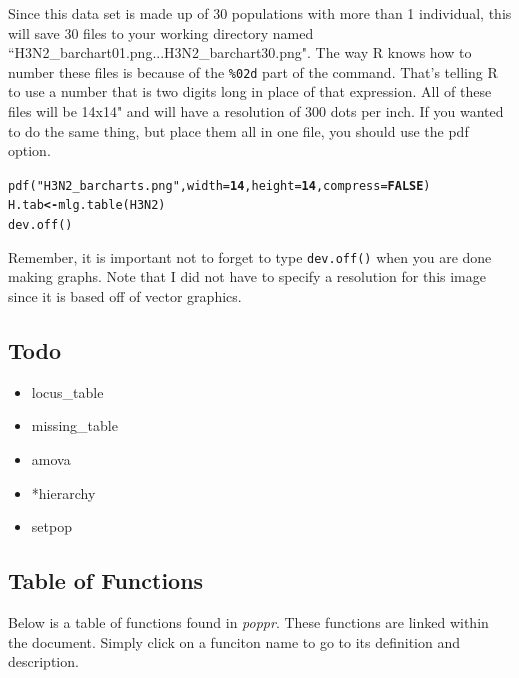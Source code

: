 \documentclass[letterpaper]{article}\usepackage[]{graphicx}\usepackage[]{color}
\makeatletter
\newcommand{\hlnum}[1]{\textcolor[rgb]{0.502,0,0.502}{\textbf{#1}}}%
\newcommand{\hlstr}[1]{\textcolor[rgb]{0.651,0.522,0}{#1}}%
\newcommand{\hlstd}[1]{\textcolor[rgb]{0,0,0}{#1}}%
\newcommand{\hlkwb}[1]{\textcolor[rgb]{0.502,0.502,0.753}{\textbf{#1}}}%
\newcommand{\hlkwc}[1]{\textcolor[rgb]{0,0.502,0.753}{#1}}%
\newcommand{\hlkwd}[1]{\textcolor[rgb]{0,0.267,0.4}{#1}}%
\newenvironment{kframe}{%
 \def\at@end@of@kframe{}%
 \ifinner\ifhmode%
  \def\at@end@of@kframe{\end{minipage}}%
  \begin{minipage}{\columnwidth}%
 \fi\fi%
 \def\FrameCommand##1{\hskip\@totalleftmargin \hskip-\fboxsep
 \colorbox{shadecolor}{##1}\hskip-\fboxsep
     \hskip-\linewidth \hskip-\@totalleftmargin \hskip\columnwidth}%
 \MakeFramed {\advance\hsize-\width
   \@totalleftmargin\z@ \linewidth\hsize
   \@setminipage}}%
 {\par\unskip\endMakeFramed%
 \at@end@of@kframe}
\newenvironment{knitrout}{}{} %
\newcommand{\tab}{\hspace*{1em}}
\makeatother
\begin{document}
Since this data set is made up of 30 populations with more than 1 individual, this will save 30 files to your working directory named ``H3N2\_barchart01.png...H3N2\_barchart30.png". The way R knows how to number these files is because of the \texttt{\%02d} part of the command. That's telling R to use a number that is two digits long in place of that expression. All of these files will be 14x14" and will have a resolution of 300 dots per inch. If you wanted to do the same thing, but place them all in one file, you should use the pdf option.

\begin{knitrout}\footnotesize
{}\color{fgcolor}\begin{kframe}
\begin{alltt}
\hlkwd{pdf}\hlstd{(}\hlstr{"H3N2_barcharts.png"}\hlstd{,} \hlkwc{width} \hlstd{=} \hlnum{14}\hlstd{,} \hlkwc{height} \hlstd{=} \hlnum{14}\hlstd{,} \hlkwc{compress} \hlstd{=} \hlnum{FALSE}\hlstd{)}
\hlstd{H.tab} \hlkwb{<-} \hlkwd{mlg.table}\hlstd{(H3N2)}
\hlkwd{dev.off}\hlstd{()}
\end{alltt}
\end{kframe}
\end{knitrout}


Remember, it is important not to forget to type \texttt{dev.off()} when you are done making graphs. Note that I did not have to specify a resolution for this image since it is based off of vector graphics.

\subsection{Todo}

\begin{itemize}
  \item locus\_table
  \item missing\_table
  \item amova
  \item *hierarchy
  \item setpop
\end{itemize}

\subsection{Table of Functions}\label{appendix:funk}

\tab\tab Below is a table of functions found in \textit{poppr}. These functions are
linked within the document. Simply click on a funciton name to go to its definition 
and description. 
\end{document}
